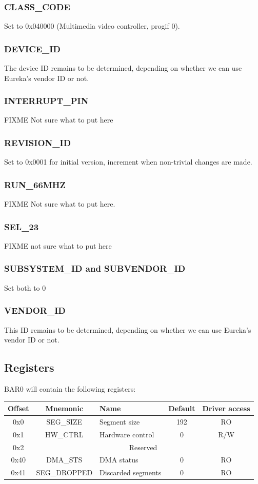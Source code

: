 \documentclass[12pt]{article}
\begin{document}
\subsubsection{CLASS\_CODE}
Set to 0x040000 (Multimedia video controller, progif 0).

\subsubsection{DEVICE\_ID}
The device ID remains to be determined, depending on whether we can use Eureka's vendor ID or not.

\subsubsection{INTERRUPT\_PIN}
FIXME Not sure what to put here

\subsubsection{REVISION\_ID}
Set to 0x0001 for initial version, increment when non-trivial changes are made.

\subsubsection{RUN\_66MHZ}
FIXME Not sure what to put here.

\subsubsection{SEL\_23}
FIXME not sure what to put here

\subsubsection{SUBSYSTEM\_ID and SUBVENDOR\_ID}
Set both to 0

\subsubsection{VENDOR\_ID}
This ID remains to be determined, depending on whether we can use Eureka's vendor ID or not.

\subsection{Registers}

BAR0 will contain the following registers:

\begin{tabular}{|c|c|l|c|c|} \hline
\textbf{Offset} & \textbf{Mnemonic} & \textbf{Name} & \textbf{Default} & \textbf{Driver access} \\ \hline
0x0 & SEG\_SIZE & Segment size & 192 & RO \\ \hline
0x1 & HW\_CTRL & Hardware control & 0 & R/W \\ \hline
0x2 & \multicolumn{4}{|c|}{Reserved} \\ \hline
0x40 & DMA\_STS & DMA status & 0 & RO \\ \hline
0x41 & SEG\_DROPPED & Discarded segments & 0 & RO \\ \hline
\end{tabular}
\end{document}
